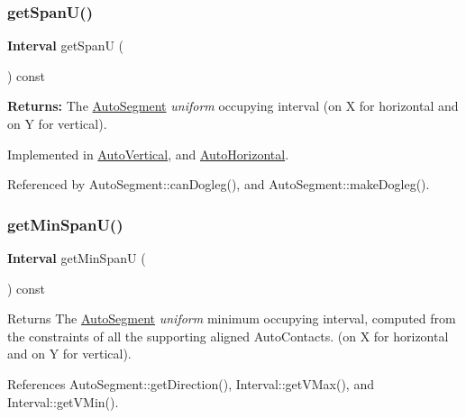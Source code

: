 \subsubsection{\texorpdfstring{get\+Span\+U()}{getSpanU()}}
{\footnotesize\ttfamily \textbf{ Interval} get\+SpanU (\begin{DoxyParamCaption}{ }\end{DoxyParamCaption}) const\hspace{0.3cm}{\ttfamily [pure virtual]}}

{\bfseries Returns\+:} The \hyperlink{classKatabatic_1_1AutoSegment}{Auto\+Segment} {\itshape uniform} occupying interval (on X for horizontal and on Y for vertical). 

Implemented in \hyperlink{classKatabatic_1_1AutoVertical_a0b5ac47ab175815e1a9bc07f2517614a}{Auto\+Vertical}, and \hyperlink{classKatabatic_1_1AutoHorizontal_a0b5ac47ab175815e1a9bc07f2517614a}{Auto\+Horizontal}.



Referenced by Auto\+Segment\+::can\+Dogleg(), and Auto\+Segment\+::make\+Dogleg().

\mbox{\label{classKatabatic_1_1AutoSegment_acc329583aa1546ed5a01e0628f3ca6ad}} 
\subsubsection{\texorpdfstring{get\+Min\+Span\+U()}{getMinSpanU()}}
{\footnotesize\ttfamily \textbf{ Interval} get\+Min\+SpanU (\begin{DoxyParamCaption}{ }\end{DoxyParamCaption}) const}

\begin{DoxyReturn}{Returns}
The \hyperlink{classKatabatic_1_1AutoSegment}{Auto\+Segment} {\itshape uniform} minimum occupying interval, computed from the constraints of all the supporting aligned Auto\+Contacts. (on X for horizontal and on Y for vertical). 
\end{DoxyReturn}


References Auto\+Segment\+::get\+Direction(), Interval\+::get\+V\+Max(), and Interval\+::get\+V\+Min().

\mbox{\label{classKatabatic_1_1AutoSegment_ab7685e309e1d910db3e8237f8a898c35}} 
